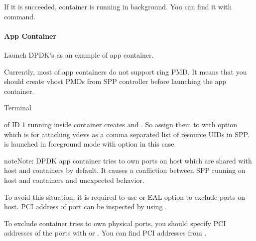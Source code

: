 \documentclass[a4paper,11pt,openany,oneside,english]{sphinxmanual}
\begin{document}
If it is succeeded, container is running in background.
You can find it with  command.


\paragraph{App Container}
\label{\detokenize{tools/sppc/getting_started:app-container}}
Launch DPDK’s  as an example of app container.

Currently, most of app containers do not support ring PMD.
It means that you should create vhost PMDs from SPP controller
before launching the app container.

\begin{sphinxVerbatim}[commandchars=\\\{\},formatcom=\footnotesize]
 Terminal 
\end{sphinxVerbatim}

 of ID 1 running inside container creates  and
. So assign them to  with  option which is for
attaching vdevs as a comma separated list of resource UIDs in SPP.
 is launched in foreground mode with  option in this case.

\begin{sphinxadmonition}{note}{Note:}
DPDK app container tries to own ports on host which are shared with host
and containers by default. It causes a confliction between SPP running on
host and containers and unexpected behavior.

To avoid this situation, it is required to use  or
 EAL option to exclude ports on host. PCI address of
port can be inspected by using .
\end{sphinxadmonition}

To exclude  container tries to own physical ports, you should
specify PCI addresses of the ports with  or .
You can find PCI addresses from .
\end{document}
